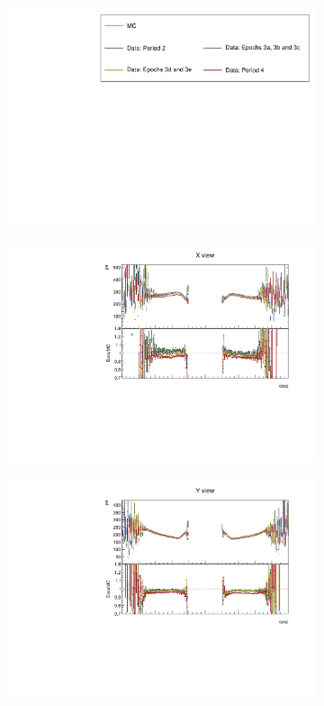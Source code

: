 \documentclass[12pt,a4paper]{article}
\begin{document}
\begin{figure}[h!]
  \begin{subfigure}{\textwidth}
    \centering
    \includegraphics[height=0.2\linewidth]{essentialsec_tb/legend.pdf}
  \end{subfigure}
  \vspace*{2mm}
  
  \begin{subfigure}{0.5\textwidth}
    \includegraphics[width=\linewidth]{PlotsAngularDistribution/pe_cosz_x.pdf}
  \end{subfigure}
  \begin{subfigure}{0.5\textwidth}
    \includegraphics[width=\linewidth]{PlotsAngularDistribution/pe_cosz_y.pdf}

\end{subfigure}
\end{figure}
\end{document}
